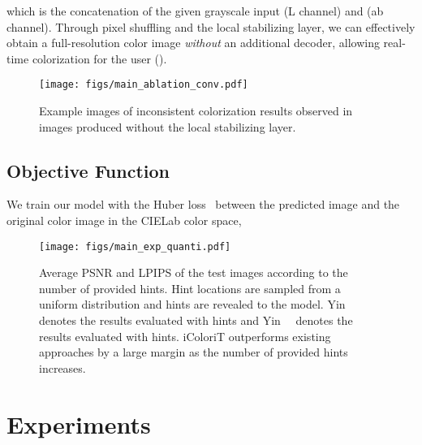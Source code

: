 \documentclass[10pt,twocolumn,letterpaper]{article}
\begin{document}
which is the concatenation of the given grayscale input  (L channel)  and  (ab channel). 
Through pixel shuffling and the local stabilizing layer, we can effectively obtain a full-resolution color image \emph{without} an additional decoder, allowing real-time colorization for the user (). 

\begin{figure}[t]
    \centering
    \texttt{[image: figs/main\_ablation\_conv.pdf]}
    \vspace{-0.4cm}
    \caption{Example images of inconsistent colorization results observed in images produced without the local stabilizing layer. }
    \label{fig:ablation_conv}
    \vspace{-0.2cm}
\end{figure}

\subsection{Objective Function}

We train our model with the Huber loss~\cite{huber} between the predicted image and the original color image in the CIELab color space, 
\vspace{-0.2cm}




\begin{figure*}[ht]
    \centering
    \texttt{[image: figs/main\_exp\_quanti.pdf]}
    \vspace{-0.6cm}
    \caption{Average PSNR and LPIPS of the test images according to the number of provided hints. Hint locations are sampled from a uniform distribution and  hints are revealed to the model. Yin~\etal~\cite{side} denotes the results evaluated with  hints and Yin~\etal~\cite{side} denotes the results evaluated with  hints. iColoriT outperforms existing approaches by a large margin as the number of provided hints increases.}
    \label{fig:exp_quanti_psnr}
    \vspace{-0.5cm}
\end{figure*}


\section{Experiments}
\label{sec:impl_details}
\vspace{-0.1cm}
\end{document}
